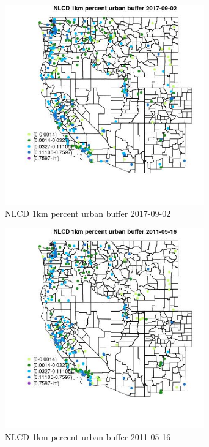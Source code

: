 \begin{figure} 
\centering  
\includegraphics[width=0.77\textwidth]{Code_Outputs/Report_ML_input_PM25_Step4_part_e_de_duplicated_aves_compiled_2019-05-20wNAs_MapObsNLCD_1km_percent_urban_buffer2017-09-02.jpg} 
\caption{\label{fig:Report_ML_input_PM25_Step4_part_e_de_duplicated_aves_compiled_2019-05-20wNAsMapObsNLCD_1km_percent_urban_buffer2017-09-02}NLCD 1km percent urban buffer 2017-09-02} 
\end{figure} 
 

\begin{figure} 
\centering  
\includegraphics[width=0.77\textwidth]{Code_Outputs/Report_ML_input_PM25_Step4_part_e_de_duplicated_aves_compiled_2019-05-20wNAs_MapObsNLCD_1km_percent_urban_buffer2011-05-16.jpg} 
\caption{\label{fig:Report_ML_input_PM25_Step4_part_e_de_duplicated_aves_compiled_2019-05-20wNAsMapObsNLCD_1km_percent_urban_buffer2011-05-16}NLCD 1km percent urban buffer 2011-05-16} 
\end{figure} 
 

